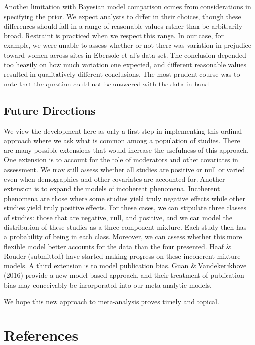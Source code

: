 \documentclass[english,man]{apa6}
\theoremstyle{definition}
\theoremstyle{definition}
\theoremstyle{remark}
\begin{document}
Another limitation with Bayesian model comparison comes from
considerations in specifying the prior. We expect analysts to differ in
their choices, though these differences should fall in a range of
reasonable values rather than be arbitrarily broad. Restraint is
practiced when we respect this range. In our case, for example, we were
unable to assess whether or not there was variation in prejudice toward
women across sites in Ebersole et al's data set. The conclusion depended
too heavily on how much variation one expected, and different reasonable
values resulted in qualitatively different conclusions. The most prudent
course was to note that the question could not be answered with the data
in hand.

\subsection{Future Directions}\label{future-directions}

We view the development here as only a first step in implementing this
ordinal approach where we ask what is common among a population of
studies. There are many possible extensions that would increase the
usefulness of this approach. One extension is to account for the role of
moderators and other covariates in assessment. We may still assess
whether all studies are positive or null or varied even when
demographics and other covariates are accounted for. Another extension
is to expand the models of incoherent phenomena. Incoherent phenomena
are those where some studies yield truly negative effects while other
studies yield truly positive effects. For these cases, we can stipulate
three classes of studies: those that are negative, null, and positive,
and we can model the distribution of these studies as a three-component
mixture. Each study then has a probability of being in each class.
Moreover, we can assess whether this more flexible model better accounts
for the data than the four presented. Haaf \& Rouder (submitted) have
started making progress on these incoherent mixture models. A third
extension is to model publication bias. Guan \& Vandekerckhove (2016)
provide a new model-based approach, and their treatment of publication
bias may conceivably be incorporated into our meta-analytic models.

We hope this new approach to meta-analysis proves timely and topical.

\newpage

\section*{References}\label{references}
\end{document}
